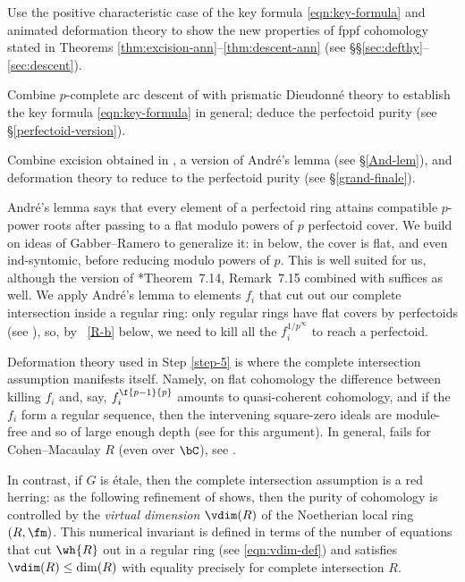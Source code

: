 \m \label{step-3}
Use the positive characteristic case of the key formula \eqref{eqn:key-formula} and animated deformation theory to show the new properties of fppf cohomology stated in Theorems \ref{thm:excision-ann}--\ref{thm:descent-ann} (see \S\S\ref{sec:defthy}--\ref{sec:descent}).

\m
Combine $p$-complete arc descent of  with prismatic Dieudonn\'{e} theory to establish the key formula \eqref{eqn:key-formula} in general; deduce the perfectoid purity  (see \S\ref{perfectoid-version}).

\m \label{step-5}
Combine excision obtained in , a version of Andr\'{e}'s lemma (see \S\ref{And-lem}), and deformation theory to reduce  to the perfectoid purity  (see \S\ref{grand-finale}).
\eenum


Andr\'{e}'s lemma says that every element of a perfectoid ring attains compatible $p$-power roots after passing to a flat modulo powers of $p$ perfectoid cover. We build on ideas of Gabber--Ramero to generalize it: in  below, the cover is flat, and even ind-syntomic, before reducing modulo powers of $p$. This is well suited for us, although the version of \cite{BS19}*{Theorem~7.14, Remark~7.15} combined with  suffices as well. %
We apply Andr\'{e}'s lemma to elements $f_i$ that cut out our complete intersection  inside a regular ring:  only regular rings have flat covers by perfectoids (see \cite{BIM19}), so, by ~\ref{R-b} below, we need to kill all the $f_i^{1/p^{\infty}}$ to reach a perfectoid.

Deformation theory used in Step \ref{step-5} is where the complete intersection assumption manifests itself. Namely, on flat cohomology the difference between killing $f_i$ and, say, $f_i^{\f{p - 1}{p}}$ amounts to quasi-coherent cohomology, and if the $f_i$ form a regular sequence, then the intervening square-zero ideals are module-free and so of large enough depth (see  for this argument). In general,  fails for Cohen--Macaulay $R$ (even over $\bC$), see .

In contrast, if $G$ is \'{e}tale, then the complete intersection assumption is a red herring: as the following refinement of  shows, then the purity of cohomology is controlled by the \emph{virtual dimension} $\vdim(R)$ of the Noetherian local ring $(R, \fm)$. This numerical invariant is defined in terms of the number of equations that cut $\wh{R}$ out in a regular ring (see \eqref{eqn:vdim-def}) and satisfies $\vdim(R) \le \dim(R)$ with equality precisely for complete intersection $R$.



